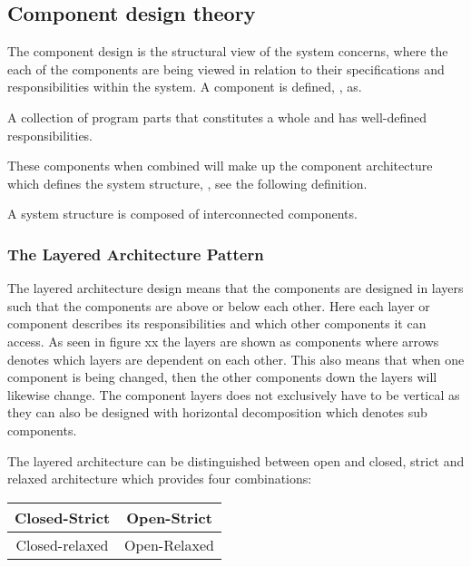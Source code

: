 \subsection{Component design theory} \label{sec:archicomponents}
The component design \cite{Rod-Aalborg} is the structural view of the system concerns, where the each of the components are being viewed in relation to their specifications and responsibilities within the system.
A component is defined, \citep[p.~192]{Rod-Aalborg}, as.
\begin{defn}\label{defn:component}
	A collection of program parts that constitutes a whole and has well-defined responsibilities. 
\end{defn}

These components when combined will make up the component architecture which defines the system structure, \citep[p.~192]{Rod-Aalborg}, see the following definition. 
\begin{defn}\label{defn:Structure}
	A system structure is composed of interconnected components. 
\end{defn}

\subsubsection*{The Layered Architecture Pattern}

The layered architecture design means that the components are designed in layers such that the components are above or below each other.
Here each layer or component describes its responsibilities and which other components it can access.
As seen in {\color{red}figure xx} the layers are shown as components where arrows denotes which layers are dependent on each other.
This also means that when one component is being changed, then the other components down the layers will likewise change.
The component layers does not exclusively have to be vertical as they can also be designed with horizontal decomposition which denotes sub components.

The layered architecture can be distinguished between open and closed, strict and relaxed architecture which provides four combinations:

\begin{center}
	\begin{tabular}{| c | c |}
		\hline
		Closed-Strict & Open-Strict \\
		\hline
		Closed-relaxed & Open-Relaxed \\
		\hline
	\end{tabular}
\end{center}

